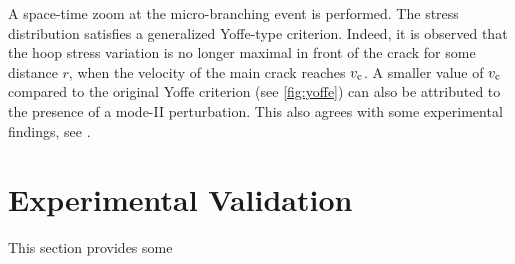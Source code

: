 A space-time zoom at the micro-branching event is performed. The stress distribution satisfies a generalized Yoffe-type criterion. Indeed, it is observed that the hoop stress variation is no longer maximal in front of the crack for some distance $r$, when the velocity of the main crack reaches $v_{\mathrm{c}}$. A smaller value of $v_{\mathrm{c}}$ compared to the original Yoffe criterion (see \cref{fig:yoffe}) can also be attributed to the presence of a mode-II perturbation. This also agrees with some experimental findings, see \cite{BoueCohenFineberg:2015}.

\section{Experimental Validation} \label{sec:valicon}
This section provides some 

